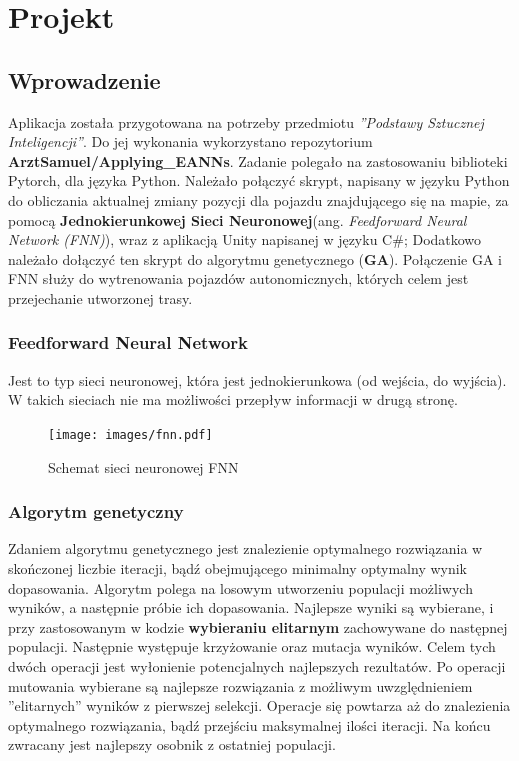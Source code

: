 \chapter{Projekt}
\section{Wprowadzenie}
Aplikacja została przygotowana na potrzeby przedmiotu \textit{''Podstawy Sztucznej Inteligencji''}. Do jej wykonania wykorzystano repozytorium \textbf{ArztSamuel/Applying\_EANNs}\cite{aeann_psi}. Zadanie polegało na zastosowaniu biblioteki Pytorch\cite{NEURIPS2019_9015}, dla języka Python. Należało połączyć skrypt, napisany w języku Python do obliczania aktualnej zmiany pozycji dla pojazdu znajdującego się na mapie, za pomocą \textbf{Jednokierunkowej Sieci Neuronowej}(ang. \textit{Feedforward Neural Network (FNN)}), wraz z aplikacją Unity napisanej w języku C$\#$; Dodatkowo należało dołączyć ten skrypt do algorytmu genetycznego (\textbf{GA}). Połączenie GA i FNN służy do wytrenowania pojazdów autonomicznych, których celem jest przejechanie utworzonej trasy.  

\subsection{Feedforward Neural Network}
Jest to typ sieci neuronowej, która jest jednokierunkowa (od wejścia, do wyjścia). W takich sieciach nie ma możliwości przepływ informacji w drugą stronę.\cite{lnn}

\begin{figure}[H]
    \texttt{[image: images/fnn.pdf]}
    \caption{Schemat sieci neuronowej FNN}
    \label{fig:fnn}
\end{figure}

\subsection{Algorytm genetyczny}
Zdaniem algorytmu genetycznego jest znalezienie optymalnego rozwiązania w skończonej liczbie iteracji, bądź obejmującego minimalny optymalny wynik dopasowania. Algorytm polega na losowym utworzeniu populacji możliwych wyników, a następnie próbie ich dopasowania. Najlepsze wyniki są wybierane, i przy zastosowanym w kodzie \textbf{wybieraniu elitarnym} zachowywane do następnej populacji. Następnie występuje krzyżowanie oraz mutacja wyników. Celem tych dwóch operacji jest wyłonienie potencjalnych najlepszych rezultatów. Po operacji mutowania wybierane są najlepsze rozwiązania z możliwym uwzględnieniem ''elitarnych'' wyników z pierwszej selekcji. Operacje się powtarza aż do znalezienia optymalnego rozwiązania, bądź przejściu maksymalnej ilości iteracji. Na końcu zwracany jest najlepszy osobnik z ostatniej populacji.

